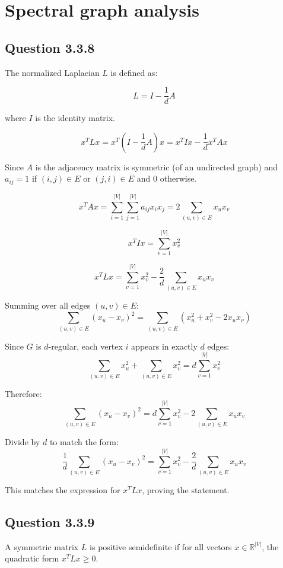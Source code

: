 \documentclass{article}
\begin{document}
\newpage

\section{Spectral graph analysis}

\subsection{Question 3.3.8}

The normalized Laplacian \( L \) is defined as:

\[
L = I - \frac{1}{d} A
\]

where \( I \) is the identity matrix.

\[
x^T L x = x^T \left(I - \frac{1}{d} A\right) x = x^T I x - \frac{1}{d} x^T A x
\]

Since \(A\) is the adjacency matrix is symmetric (of an undirected graph) and \(a_{ij} = 1\) if \((i, j) \in E\) or \((j, i) \in E\) and \(0\) otherwise.

\[
x^T A x = \sum_{i=1}^{|V|} \sum_{j=1}^{|V|} a_{ij} x_i x_j = 2 \sum_{(u,v) \in E} x_u x_v
\]

\[
x^T I x = \sum_{v=1}^{|V|} x_v^2
\]

\[
x^T L x = \sum_{v=1}^{|V|} x_v^2 - \frac{2}{d} \sum_{(u,v) \in E} x_u x_v
\]

Summing over all edges \((u, v) \in E\):
\[
\sum_{(u,v) \in E} (x_u - x_v)^2 = \sum_{(u,v) \in E} (x_u^2 + x_v^2 - 2x_u x_v)
\]

Since \( G \) is \( d \)-regular, each vertex \( i \) appears in exactly \( d \) edges:
\[
\sum_{(u,v) \in E} x_u^2 + \sum_{(u,v) \in E} x_v^2 = d \sum_{v=1}^{|V|} x_v^2
\]

Therefore:
\[
\sum_{(u,v) \in E} (x_u - x_v)^2 = d \sum_{v=1}^{|V|} x_v^2 - 2 \sum_{(u,v) \in E} x_u x_v
\]

Divide by \( d \) to match the form:
\[
\frac{1}{d} \sum_{(u,v) \in E} (x_u - x_v)^2 = \sum_{v=1}^{|V|} x_v^2 - \frac{2}{d} \sum_{(u,v) \in E} x_u x_v
\]

This matches the expression for \( x^T L x \), proving the statement.

\subsection{Question 3.3.9}

A symmetric matrix \( L \) is positive semidefinite if for all vectors \( x \in \mathbb{R}^{|V|} \), the quadratic form \( x^T L x \geq 0 \).
\end{document}
